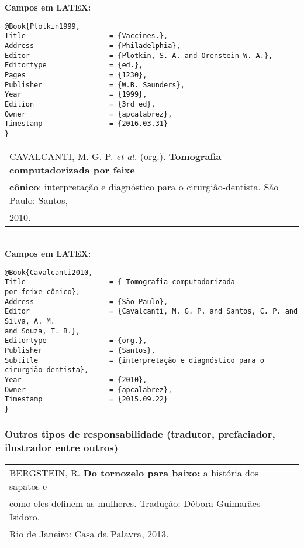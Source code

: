 \textbf{Campos em LATEX:}

\begin{verbatim}
@Book{Plotkin1999,
Title                    = {Vaccines.},
Address                  = {Philadelphia},
Editor                   = {Plotkin, S. A. and Orenstein W. A.},
Editortype               = {ed.},
Pages                    = {1230},
Publisher                = {W.B. Saunders},
Year                     = {1999},
Edition                  = {3rd ed},
Owner                    = {apcalabrez},
Timestamp                = {2016.03.31}
}
\end{verbatim}

\begin{tabular}{|l|c|} \hline
	CAVALCANTI, M. G. P. \textit{et al.} (org.). \textbf{Tomografia computadorizada por feixe} \\ \textbf{cônico}: interpretação e diagnóstico para o cirurgião-dentista. São Paulo: Santos, \\ 2010.\\\hline
\end{tabular}\\

\textbf{Campos em LATEX:}

\begin{verbatim}
@Book{Cavalcanti2010,
Title                    = { Tomografia computadorizada 
por feixe cônico},
Address                  = {São Paulo},
Editor                   = {Cavalcanti, M. G. P. and Santos, C. P. and 
Silva, A. M.
and Souza, T. B.},
Editortype               = {org.},
Publisher                = {Santos},
Subtitle                 = {interpretação e diagnóstico para o 
cirurgião-dentista},
Year                     = {2010},
Owner                    = {apcalabrez},
Timestamp                = {2015.09.22}
}
\end{verbatim}

\subsubsection{Outros tipos de responsabilidade (tradutor, prefaciador, ilustrador entre outros)} 


\begin{tabular}{|l|c|} \hline
	BERGSTEIN, R. \textbf{Do tornozelo para baixo:}  a história dos
	sapatos e \\ como eles definem as mulheres. Tradução: Débora Guimarães Isidoro.\\ Rio de
	Janeiro: Casa da Palavra, 2013. \\\hline
\end{tabular}\\

